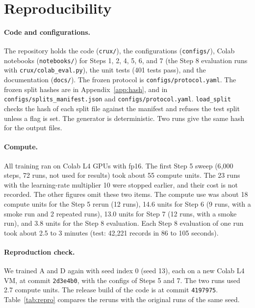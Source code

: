\documentclass[11pt,a4paper]{article}
\begin{document}
\section{Reproducibility}\label{sec:repro}

\paragraph{Code and configurations.}
The repository holds the code (\texttt{crux/}), the configurations (\texttt{configs/}), Colab notebooks (\texttt{notebooks/}) for Steps 1, 2, 4, 5, 6, and 7 (the Step 8 evaluation runs with \texttt{crux/colab\_eval.py}), the unit tests (401 tests pass), and the documentation (\texttt{docs/}).
The frozen protocol is \texttt{configs/protocol.yaml}.
The frozen split hashes are in Appendix~\ref{app:hash}, and in \texttt{configs/splits\_manifest.json} and \texttt{configs/protocol.yaml}.
\texttt{load\_split} checks the hash of each split file against the manifest and refuses the test split unless a flag is set.
The generator is deterministic.
Two runs give the same hash for the output files.

\paragraph{Compute.}
All training ran on Colab L4 GPUs with fp16.
The first Step 5 sweep (6{,}000 steps, 72 runs, not used for results) took about 55 compute units.
The 23 runs with the learning-rate multiplier 10 were stopped earlier, and their cost is not recorded.
The other figures omit these two items.
The compute use was about 18 compute units for the Step 5 rerun (12 runs), 14.6 units for Step 6 (9 runs, with a smoke run and 2 repeated runs), 13.0 units for Step 7 (12 runs, with a smoke run), and 3.8 units for the Step 8 evaluation.
Each Step 8 evaluation of one run took about 2.5 to 3 minutes (test: 42{,}221 records in 86 to 105 seconds).

\paragraph{Reproduction check.}
We trained A and D again with seed index 0 (seed 13), each on a new Colab L4 VM, at commit \texttt{2d3e4b0}, with the configs of Steps 5 and 7.
The two runs used 2.7 compute units.
The release build of the code is at commit \texttt{4197975}.
Table~\ref{tab:repro} compares the reruns with the original runs of the same seed.
\end{document}
